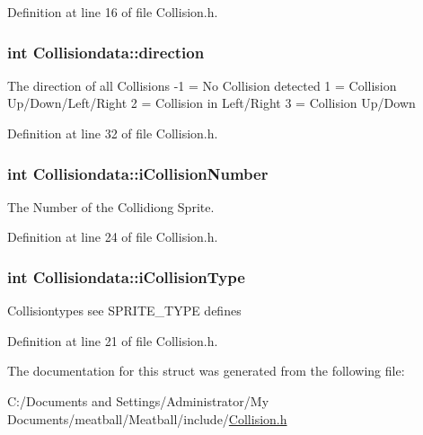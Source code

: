 Definition at line 16 of file Collision.\-h.

\hypertarget{struct_collisiondata_a9d98f1b596ad915987b73710ea9a55ff}{
\subsubsection[{direction}]{\setlength{\rightskip}{0pt plus 5cm}int Collisiondata\-::direction}}\label{struct_collisiondata_a9d98f1b596ad915987b73710ea9a55ff}
The direction of all Collisions -\/1 = No Collision detected 1 = Collision Up/\-Down/\-Left/\-Right 2 = Collision in Left/\-Right 3 = Collision Up/\-Down 

Definition at line 32 of file Collision.\-h.

\hypertarget{struct_collisiondata_ac5b2f3eb131fb4ba3dc8d2cfaed65006}{
\subsubsection[{i\-Collision\-Number}]{\setlength{\rightskip}{0pt plus 5cm}int Collisiondata\-::i\-Collision\-Number}}\label{struct_collisiondata_ac5b2f3eb131fb4ba3dc8d2cfaed65006}


The Number of the Collidiong Sprite. 



Definition at line 24 of file Collision.\-h.

\hypertarget{struct_collisiondata_a7b1299fc0c8589d2e4c3b64e29e9f722}{
\subsubsection[{i\-Collision\-Type}]{\setlength{\rightskip}{0pt plus 5cm}int Collisiondata\-::i\-Collision\-Type}}\label{struct_collisiondata_a7b1299fc0c8589d2e4c3b64e29e9f722}
Collisiontypes see S\-P\-R\-I\-T\-E\-\_\-\-T\-Y\-P\-E defines 

Definition at line 21 of file Collision.\-h.



The documentation for this struct was generated from the following file\-:\begin{DoxyCompactItemize}
\item 
C\-:/\-Documents and Settings/\-Administrator/\-My Documents/meatball/\-Meatball/include/\hyperlink{_collision_8h}{Collision.\-h}\end{DoxyCompactItemize}
